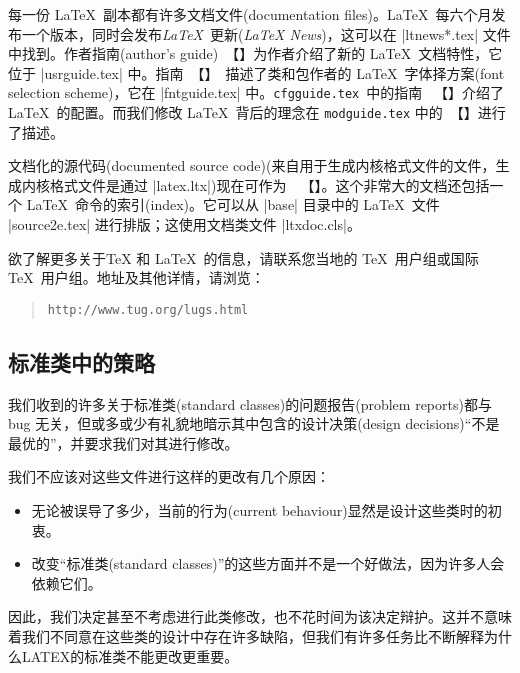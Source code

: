 \documentclass{ltxguide}[1995/11/28]
\begin{document}
每一份 \LaTeX{}\ 副本都有许多文档文件(documentation files)。\LaTeX{}\ 每六个月发布一个版本，同时会发布{\emph{\LaTeX{}}}\ {\kaiti 更新}(\emph{\LaTeX{} News})，这可以在 |ltnews*.tex| 文件中找到。作者指南(author's guide)\ {\color{blue}{\emph{\usrguide}}}【{\color{blue}{《\LaTeXe\ 作者指南》}}】为作者介绍了新的 \LaTeX{}\ 文档特性，它位于 |usrguide.tex| 中。指南\ {\color{blue}{\emph{\fntguide}}}【{\color{blue}{《\LaTeXe\ 的字体选择》}}】\ 描述了类和包作者的 \LaTeX{}\ 字体择方案(font selection scheme)，它在 |fntguide.tex| 中。\texttt{cfgguide.tex}\ 中的指南\ {\color{blue} {\emph{\cfgguide}}}【{\color{blue}{《\LaTeXe\ 的配置选项指南》}}】介绍了 \LaTeX{}\ 的配置。而我们修改 \LaTeX{}\ 背后的理念在 \texttt{modguide.tex} 中的\ {\color{blue}{\emph{\modguide}}}【{}】进行了描述。

文档化的源代码(documented source code)(来自用于生成内核格式文件的文件，生成内核格式文件是通过 |latex.ltx|)现在可作为\ {}\ 【{\color{blue}{《\LaTeXe\ 源代码》}}】。这个非常大的文档还包括一个 \LaTeX{}\ 命令的索引(index)。它可以从 |base| 目录中的 \LaTeX{}\ 文件 |source2e.tex| 进行排版；这使用文档类文件 |ltxdoc.cls|。

欲了解更多关于\TeX{} 和 \LaTeX{}\ 的信息，请联系您当地的 \TeX{}\ 用户组或国际 \TeX{}\ 用户组。地址及其他详情，请浏览：
\begin{quote}\small\label{addrs}
   \texttt{http://www.tug.org/lugs.html}
\end{quote}


\subsection[标准类中的策略]{\heiti 标准类中的策略}

我们收到的许多关于标准类(standard classes)的问题报告(problem reports)都与 bug 无关，但或多或少有礼貌地暗示其中包含的设计决策(design decisions)“不是最优的”，并要求我们对其进行修改。

我们不应该对这些文件进行这样的更改有几个原因：
\begin{itemize}
   \item
         无论被误导了多少，当前的行为(current behaviour)显然是设计这些类时的初衷。
   \item
         改变“标准类(standard classes)”的这些方面并不是一个好做法，因为许多人会依赖它们。
\end{itemize}

因此，我们决定甚至不考虑进行此类修改，也不花时间为该决定辩护。这并不意味着我们不同意在这些类的设计中存在许多缺陷，但我们有许多任务比不断解释为什么LATEX的标准类不能更改更重要。
\end{document}
